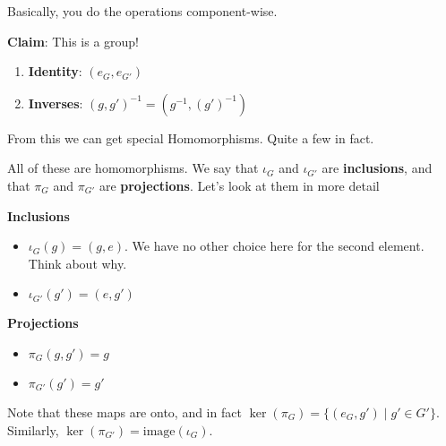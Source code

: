 \documentclass[12pt]{article}
\def\image{\text{image}}
\begin{document}
Basically, you do the operations component-wise.

{\bf Claim}: This is a group!

\begin{enumerate}
  \item {\bf Identity}: $(e_G, e_{G'})$
  \item {\bf Inverses}: $(g, g')^{-1} = (g^{-1}, (g')^{-1})$
\end{enumerate}



From this we can get special Homomorphisms. Quite a few in fact.

\begin{center}
\end{center}

All of these are homomorphisms. We say that $\iota_G$ and $\iota_{G'}$ are {\bf
inclusions}, and that $\pi_G$ and $\pi_{G'}$ are {\bf projections}. Let's look
at them in more detail

{\bf Inclusions}
\begin{itemize}
  \item $\iota_G(g) = (g, e)$. We have no other choice here for the second
    element. Think about why.
  \item $\iota_{G'}(g') = (e, g')$
\end{itemize}

{\bf Projections}
\begin{itemize}
  \item $\pi_G(g, g') = g$
  \item $\pi_{G'}(g') = g'$
\end{itemize}

Note that these maps are onto, and in fact $\ker(\pi_G) = \{ (e_{G}, g') \mid g'
\in G' \}$. Similarly, $\ker(\pi_{G'}) = \image(\iota_G)$.
\end{document}
